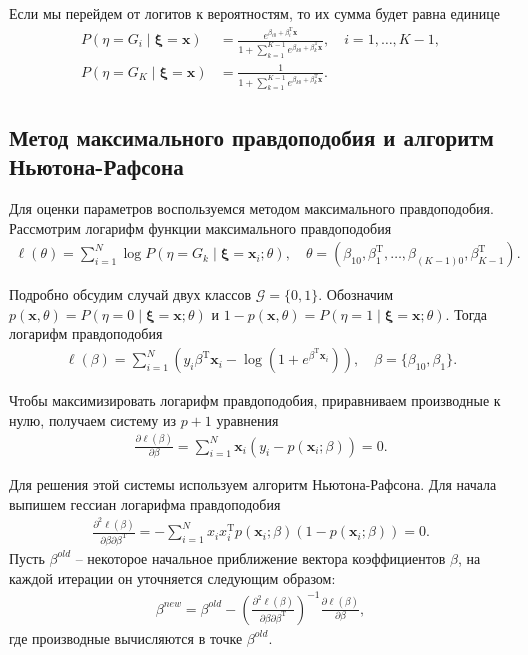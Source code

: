 \documentclass{article}
\begin{document}
Если мы перейдем от логитов к вероятностям, то их сумма будет равна единице
\begin{align*}
  P(\eta = G_i \mid \boldsymbol{\xi} = \mathbf{x}) &= \frac{e^{\beta_{i0} + \beta^\mathrm{T}_i \mathbf{x}}}{1 + \sum_{k = 1}^{K - 1}e^{\beta_{k0} + \beta^\mathrm{T}_k \mathbf{x}}}, \quad i = 1,\ldots, K - 1,\\
  P(\eta = G_K \mid \boldsymbol{\xi} = \mathbf{x}) &= \frac{1}{1 + \sum_{k = 1}^{K - 1}e^{\beta_{k0} + \beta^\mathrm{T}_k \mathbf{x}}}.
\end{align*}

\subsection{Метод максимального правдоподобия и алгоритм Ньютона-Рафсона}
Для оценки параметров воспользуемся методом максимального правдоподобия. Рассмотрим логарифм функции максимального правдоподобия
\begin{align*}
  \ell(\theta) = \sum_{i = 1}^{N} \log P(\eta = G_k \mid \boldsymbol{\xi} = \mathbf{x}_i; \theta), \quad \theta = (\beta_{10}, \beta_{1}^\mathrm{T},\ldots,\beta_{(K-1)0}, \beta_{K - 1}^\mathrm{T}).
\end{align*}

Подробно обсудим случай двух классов $\mathcal{G} = \{0, 1\}$. Обозначим $p(\mathbf{x}, \theta) = P(\eta = 0 \mid \boldsymbol{\xi} = \mathbf{x}; \theta)$ и $1 - p(\mathbf{x}, \theta) = P(\eta = 1 \mid \boldsymbol{\xi} = \mathbf{x}; \theta)$. Тогда логарифм правдоподобия
\begin{align*}
  \ell(\beta) = \sum_{i = 1}^{N}(y_i\beta^\mathrm{T}\mathbf{x}_i - \log(1 + e^{\beta^\mathrm{T}\mathbf{x}_i})), \quad \beta = \{\beta_{10}, \beta_1\}.
\end{align*}

Чтобы максимизировать логарифм правдоподобия, приравниваем производные к нулю, получаем систему из $p + 1$ уравнения
\begin{align*}
  \frac{\partial \ell(\beta)}{\partial \beta} = \sum_{i = 1}^N \mathbf{x}_i (y_i - p(\mathbf{x}_i; \beta)) = 0.
\end{align*}

Для решения этой системы используем алгоритм Ньютона-Рафсона. Для начала выпишем гессиан логарифма правдоподобия
\begin{align*}
  \frac{\partial^2 \ell(\beta)}{\partial \beta \partial \beta^{\mathrm{T}}} = -\sum_{i = 1}^N x_ix_i^\mathrm{T} p(\mathbf{x}_i; \beta)(1 - p(\mathbf{x}_i; \beta)) = 0.
\end{align*}
Пусть $\beta^{old}$ -- некоторое начальное приближение вектора коэффициентов $\beta$, на каждой итерации он уточняется следующим образом:
\begin{align*}
  \beta^{new} = \beta^{old} - \left(\frac{\partial^2 \ell(\beta)}{\partial \beta \partial \beta^{\mathrm{T}}}\right)^{-1}\frac{\partial \ell(\beta)}{\partial \beta},
\end{align*}
где производные вычисляются в точке $\beta^{old}$.
\end{document}
